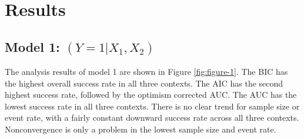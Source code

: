 \documentclass[AMA,STIX1COL]{WileyNJD-v5}
\begin{document}
\hypertarget{sec3}{%
\section{Results}\label{sec3}}

\hypertarget{model-1-y1x_1-x_2}{%
\subsection{\texorpdfstring{Model 1:
\((Y=1|X_1, X_2)\)}{Model 1: (Y=1\textbar X\_1, X\_2)}}\label{model-1-y1x_1-x_2}}

The analysis results of model 1 are shown in Figure \ref{fig:figure-1}.
The BIC has the highest overall success rate in all three contexts. The
AIC has the second highest success rate, followed by the optimism
corrected AUC. The AUC has the lowest success rate in all three
contexts. There is no clear trend for sample size or event rate, with a
fairly constant downward success rate across all three contexts.
Nonconvergence is only a problem in the lowest sample size and event
rate.
\end{document}
